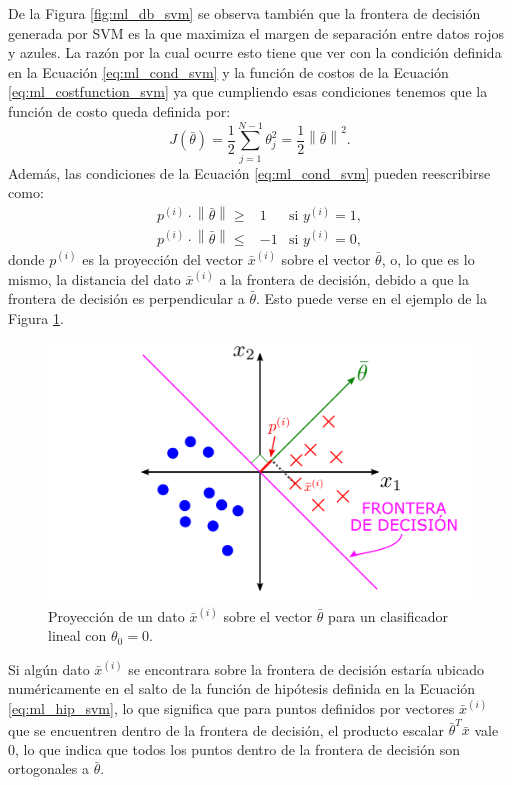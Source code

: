 De la Figura \ref{fig:ml_db_svm} se observa también que la frontera de decisión generada por SVM es la que maximiza el margen de separación entre datos rojos y azules. La razón por la cual ocurre esto tiene que ver con la condición definida en la Ecuación \ref{eq:ml_cond_svm} y la función de costos de la Ecuación \ref{eq:ml_costfunction_svm} ya que cumpliendo esas condiciones tenemos que la función de costo queda definida por:
\begin{equation}
  J(\bar{\theta})=\frac{1}{2} \sum_{j=1}^{N-1}\theta_j^2=\frac{1}{2} \left \|\bar{\theta} \right \|^2.
  \label{eq:ml_j_cost0}
\end{equation}
Además, las condiciones de la Ecuación \ref{eq:ml_cond_svm} pueden reescribirse como:
\begin{equation}
  \begin{matrix}
    p^{(i)} \cdot \left \| \bar{\theta} \right \| \geq & 1  & \textrm{si } y^{(i)} = 1, \\
    p^{(i)} \cdot \left \| \bar{\theta} \right \|\leq  & -1 & \textrm{si } y^{(i)} = 0,
  \end{matrix}
  \label{eq:ml_proyeccion_svm}
\end{equation}
donde $p^{(i)}$ es la proyección del vector $\bar{x}^{(i)}$ sobre el vector $\bar{\theta}$, o, lo que es lo mismo, la distancia del dato $\bar{x}^{(i)}$ a la frontera de decisión, debido a que la frontera de decisión es perpendicular a $\bar{\theta}$. Esto puede verse en el ejemplo de la Figura \ref{fig:ml_proyeccion_svm}.
\begin{figure}[ht!]
  \centering
  \includegraphics[width=0.7\linewidth]{images/05-Machine Learning/ml_proyeccion_svm.png}
  \caption{Proyección de un dato $\bar{x}^{(i)}$ sobre el vector $\bar{\theta}$ para un clasificador lineal con $\theta_0=0$.}
  \label{fig:ml_proyeccion_svm}
\end{figure}
Si algún dato $\bar{x}^{(i)}$ se encontrara sobre la frontera de decisión estaría ubicado numéricamente en el salto de la función de hipótesis definida en la Ecuación \ref{eq:ml_hip_svm}, lo que significa que para puntos definidos por vectores $\bar{x}^{(i)}$ que se encuentren dentro de la frontera de decisión, el producto escalar $\bar{\theta}^T \bar{x}$ vale 0, lo que indica que todos los puntos dentro de la frontera de decisión son ortogonales a $\bar{\theta}$.

